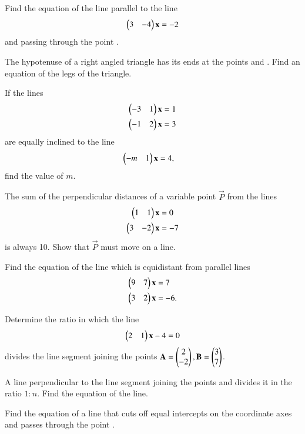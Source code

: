 \item Find the equation of the line parallel to the line 
\begin{align}
\begin{pmatrix}3 & -4\end{pmatrix}\mathbf{x} = -2
\end{align}
%
and passing through the point .
%
\item The hypotenuse of a right angled triangle has its ends at the points  and . Find an equation of the legs of the triangle.

\item If the lines
%
%
\begin{align}
\begin{pmatrix}-3 & 1\end{pmatrix}\mathbf{x} &= 1
\\
\begin{pmatrix}-1 & 2\end{pmatrix}\mathbf{x} &= 3
\end{align}
%
are equally inclined to the line
%
\begin{align}
\begin{pmatrix}-m & 1\end{pmatrix}\mathbf{x} &= 4,
\end{align}
%
find the value of $m$.
%
\item The sum of the perpendicular distances of a variable point $\vec{P}$ from the lines
%
\begin{align}
\begin{pmatrix}1 & 1\end{pmatrix}\mathbf{x} &= 0
\\
\begin{pmatrix}3 & -2\end{pmatrix}\mathbf{x} &= -7
\end{align}
%
is always 10.  Show that $\vec{P}$ must move on a line.
%
\item Find the equation of the line which is equidistant from parallel lines
%
\begin{align}
\begin{pmatrix}9 & 7\end{pmatrix}\mathbf{x} &= 7
\\
\begin{pmatrix}3 & 2\end{pmatrix}\mathbf{x} &= -6.
\end{align}
%
\item Determine the ratio in which the line 
\begin{align}
\begin{pmatrix}2 & 1\end{pmatrix}\mathbf{x} - 4 = 0
\end{align}
%
divides the line segment joining the points $\mathbf{A}=\begin{pmatrix}2\\-2\end{pmatrix}, \mathbf{B}=\begin{pmatrix}3\\7\end{pmatrix}$.
\item A line perpendicular to the line segment joining the points  and  divides it in the ratio $1:n$.  Find the equation of the line.
\item Find the equation of a line that cuts off equal intercepts on the coordinate axes and passes through the point .
